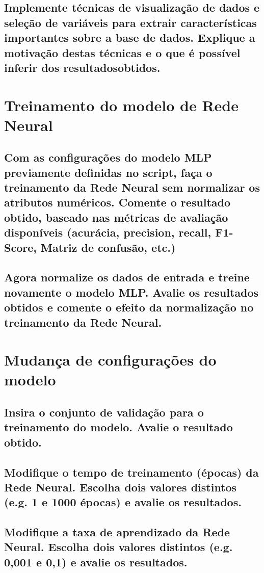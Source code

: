 \documentclass[12pt]{article}
\begin{document}
\subsection{Implemente técnicas de visualização de dados e seleção de variáveis para extrair características importantes sobre a base de dados. Explique	a motivação destas técnicas e o que é possível inferir dos resultadosobtidos.}


\section{Treinamento do modelo de Rede Neural}

\subsection{Com as configurações do modelo MLP previamente definidas no script, faça o treinamento da Rede Neural sem normalizar os atributos	numéricos. Comente o resultado obtido, baseado nas métricas de	avaliação disponíveis (acurácia, precision, recall, F1-Score, Matriz de	confusão, etc.)}

\subsection{Agora normalize os dados de entrada e treine novamente o modelo MLP.	Avalie os resultados obtidos e comente o efeito da normalização no	treinamento da Rede Neural.}
	
\section{Mudança de configurações do modelo}

\subsection{Insira o conjunto de validação para o treinamento do modelo. Avalie o resultado obtido.}

\subsection{Modifique o tempo de treinamento (épocas) da Rede Neural. Escolha dois valores distintos (e.g. 1 e 1000 épocas) e avalie os resultados.}

\subsection{Modifique a taxa de aprendizado da Rede Neural. Escolha dois valores distintos (e.g. 0,001 e 0,1) e avalie os resultados.}
\end{document}
